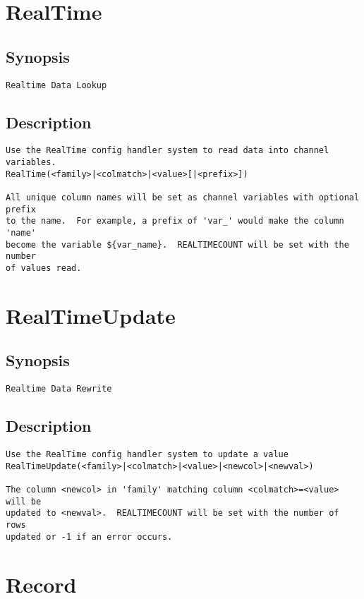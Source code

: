 \section{RealTime}
\subsection{Synopsis}
\begin{verbatim}
Realtime Data Lookup
\end{verbatim}
\subsection{Description}
\begin{verbatim}
Use the RealTime config handler system to read data into channel variables.
RealTime(<family>|<colmatch>|<value>[|<prefix>])

All unique column names will be set as channel variables with optional prefix
to the name.  For example, a prefix of 'var_' would make the column 'name'
become the variable ${var_name}.  REALTIMECOUNT will be set with the number
of values read.

\end{verbatim}


\section{RealTimeUpdate}
\subsection{Synopsis}
\begin{verbatim}
Realtime Data Rewrite
\end{verbatim}
\subsection{Description}
\begin{verbatim}
Use the RealTime config handler system to update a value
RealTimeUpdate(<family>|<colmatch>|<value>|<newcol>|<newval>)

The column <newcol> in 'family' matching column <colmatch>=<value> will be
updated to <newval>.  REALTIMECOUNT will be set with the number of rows
updated or -1 if an error occurs.

\end{verbatim}


\section{Record}
